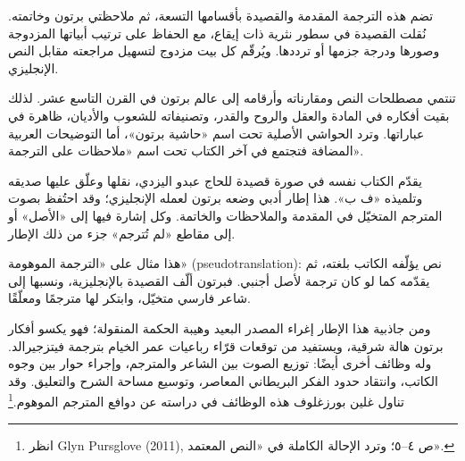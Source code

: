 
تضم هذه الترجمة المقدمة والقصيدة بأقسامها التسعة، ثم ملاحظتي برتون وخاتمته. نُقلت القصيدة في سطور نثرية ذات إيقاع، مع الحفاظ على ترتيب أبياتها المزدوجة وصورها ودرجة جزمها أو ترددها. ويُرقّم كل بيت مزدوج لتسهيل مراجعته مقابل النص الإنجليزي.

تنتمي مصطلحات النص ومقارناته وأرقامه إلى عالم برتون في القرن التاسع عشر. لذلك بقيت أفكاره في المادة والعقل والروح والقدر، وتصنيفاته للشعوب والأديان، ظاهرة في عباراتها. وترد الحواشي الأصلية تحت اسم «حاشية برتون»، أما التوضيحات العربية المضافة فتجتمع في آخر الكتاب تحت اسم «ملاحظات على الترجمة».


يقدّم الكتاب نفسه في صورة قصيدة للحاج عبدو اليزدي، نقلها وعلّق عليها صديقه وتلميذه «ف ب». هذا إطار أدبي وضعه برتون لعمله الإنجليزي؛ وقد احتُفظ بصوت المترجم المتخيّل في المقدمة والملاحظات والخاتمة. وكل إشارة فيها إلى «الأصل» أو إلى مقاطع «لم تُترجم» جزء من ذلك الإطار.

هذا مثال على «الترجمة الموهومة» (\textenglish{pseudotranslation}): نص يؤلّفه الكاتب بلغته، ثم يقدّمه كما لو كان ترجمة لأصل أجنبي. فبرتون ألّف القصيدة بالإنجليزية، ونسبها إلى شاعر فارسي متخيّل، وابتكر لها مترجمًا ومعلّقًا.

ومن جاذبية هذا الإطار إغراء المصدر البعيد وهيبة الحكمة المنقولة؛ فهو يكسو أفكار برتون هالة شرقية، ويستفيد من توقعات قرّاء رباعيات عمر الخيام بترجمة فيتزجيرالد. وله وظائف أخرى أيضًا: توزيع الصوت بين الشاعر والمترجم، وإجراء حوار بين وجوه الكاتب، وانتقاد حدود الفكر البريطاني المعاصر، وتوسيع مساحة الشرح والتعليق. وقد تناول غلين بورزغلوف هذه الوظائف في دراسته عن دوافع المترجم الموهوم.\footnote{انظر \textenglish{Glyn Pursglove (2011)}, ص ٤–٥؛ وترد الإحالة الكاملة في «النص المعتمد».}
